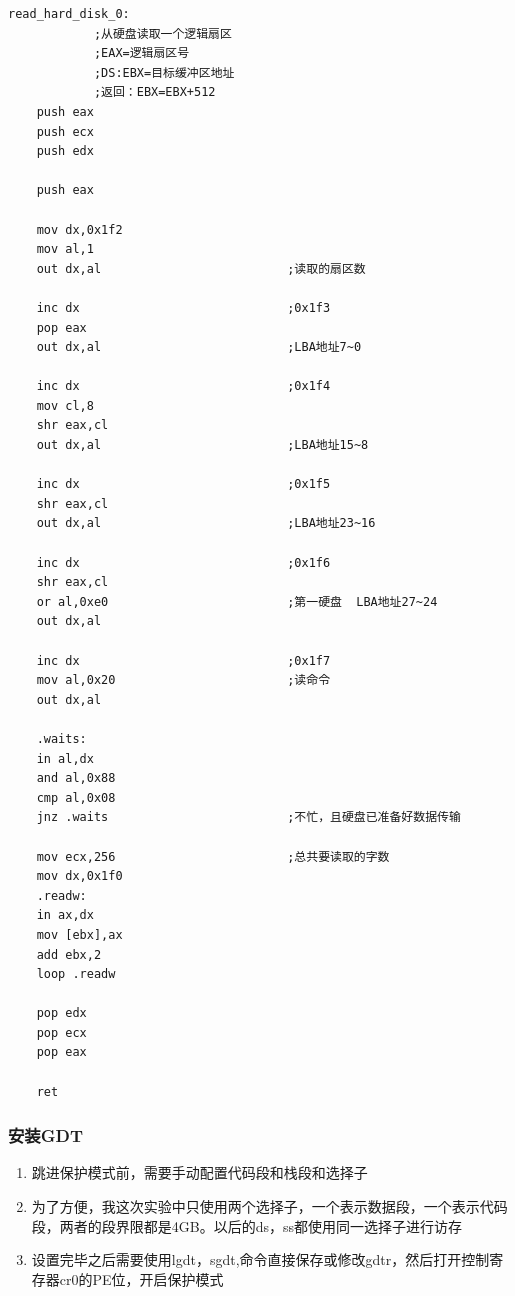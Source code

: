 \documentclass[a4paper,11pt,UTF8]{ctexart}
\begin{document}
		\begin{lstlisting}[caption={read\_hard\_disk\_0},tabsize=4,basicstyle=\footnotesize,captionpos=b]
read_hard_disk_0:                           
			;从硬盘读取一个逻辑扇区
			;EAX=逻辑扇区号
			;DS:EBX=目标缓冲区地址
			;返回：EBX=EBX+512 
	push eax 
	push ecx
	push edx

	push eax

	mov dx,0x1f2
	mov al,1
	out dx,al                          ;读取的扇区数

	inc dx                             ;0x1f3
	pop eax
	out dx,al                          ;LBA地址7~0

	inc dx                             ;0x1f4
	mov cl,8
	shr eax,cl
	out dx,al                          ;LBA地址15~8

	inc dx                             ;0x1f5
	shr eax,cl
	out dx,al                          ;LBA地址23~16

	inc dx                             ;0x1f6
	shr eax,cl
	or al,0xe0                         ;第一硬盘  LBA地址27~24
	out dx,al

	inc dx                             ;0x1f7
	mov al,0x20                        ;读命令
	out dx,al

	.waits:
	in al,dx
	and al,0x88
	cmp al,0x08
	jnz .waits                         ;不忙，且硬盘已准备好数据传输 

	mov ecx,256                        ;总共要读取的字数
	mov dx,0x1f0
	.readw:
	in ax,dx
	mov [ebx],ax
	add ebx,2
	loop .readw

	pop edx
	pop ecx
	pop eax

	ret
		\end{lstlisting}

			
		\subsubsection{安装GDT}
			\begin{enumerate}
				\item 跳进保护模式前，需要手动配置代码段和栈段和选择子
				\item 为了方便，我这次实验中只使用两个选择子，一个表示数据段，一个表示代码段，两者的段界限都是4GB。以后的ds，ss都使用同一选择子进行访存
				\item 设置完毕之后需要使用lgdt，sgdt,命令直接保存或修改gdtr，然后打开控制寄存器cr0的PE位，开启保护模式
			\end{enumerate}
			
\end{document}
